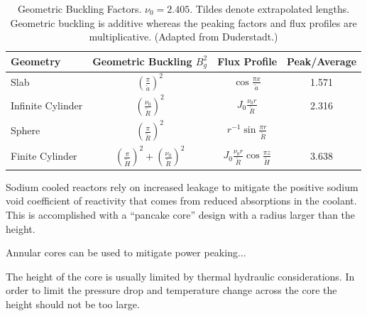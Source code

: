\begin{table}
\centering
\large
\caption{Geometric Buckling Factors. $\nu_0=2.405$. Tildes denote extrapolated lengths. Geometric buckling is additive whereas the peaking factors and flux profiles are multiplicative. (Adapted from Duderstadt.)}
\begin{tabular}{lccc}
\hline
Geometry & Geometric Buckling $B_g^2$ & Flux Profile & Peak/Average \\
\hline
Slab & $\left( \frac{\pi}{\tilde{a}} \right)^2$ & $\cos \frac{\pi x}{\tilde{a}}$ & 1.571\\
Infinite Cylinder & $\left( \frac{\nu _0}{\tilde{R}} \right)^2$ & $J_0 \frac{\nu_0 r}{\tilde{R}}$ & 2.316\\
Sphere & $\left( \frac{\pi}{\tilde{R}} \right)^2$ & $r^{-1}\sin \frac{\pi r}{\tilde{R}}$ & \\
Finite Cylinder & $\left( \frac{\pi}{\tilde{H}} \right)^2 + \left( \frac{\nu _0}{\tilde{R}}
     \right)^2$    & $J_0 \frac{\nu_0 r}{\tilde{R}} \cos \frac{\pi z}{\tilde{H}}$ & 3.638\\
\hline

\end{tabular}
\end{table}

Sodium cooled reactors rely on increased leakage to mitigate the positive sodium void coefficient of reactivity that comes from reduced absorptions in the coolant.
This is accomplished with a ``pancake core'' design with a radius larger than the height.


Annular cores can be used to mitigate power peaking...

The height of the core is usually limited by thermal hydraulic considerations. 
In order to limit the pressure drop and temperature change across the core the height should not be too large.



\begingroup
\let\cleardoublepage\clearpage




\endgroup
